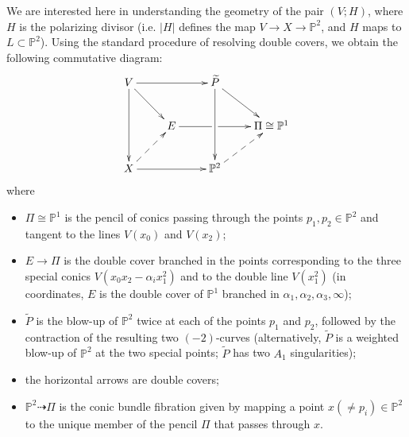 \documentclass{amsart}
\numberwithin{equation}{section}
\theoremstyle{plain}
\theoremstyle{remark}
\theoremstyle{definition}
\newcommand{\bP}{\mathbb{P}}
\begin{document}
We are interested here in understanding the geometry of the pair $(V;H)$, where $H$ is the polarizing divisor (i.e. $|H|$ defines the map $V\to X\to \bP^2$, and $H$ maps to $L\subset \bP^2$).  Using the standard procedure of resolving double covers,  we obtain the following commutative diagram:
$$\xymatrix{
V\ar@{->}[rr]\ar@{->}[dd]\ar@{->}[rd]&&\widetilde P\ar@{->}[dd]\ar@{->}[rd]&\\ 
&E\ar'[r][rr]&& \Pi\cong \bP^1\\
X\ar@{->}[rr]\ar@{-->}[ur]&&\bP^2\ar@{-->}[ur]&
}$$
where
\begin{itemize}
\item $\Pi\cong \bP^1$ is the pencil of conics passing through the points  $p_1,p_2\in \bP^2$ and tangent to the lines $V(x_0)$ and $V(x_2)$;
\item $E\to \Pi$ is the double cover branched in the points corresponding to the three special conics $V(x_0x_2-\alpha_ix_1^2)$ and to the double line $V(x_1^2)$ (in coordinates, $E$ is the double cover of $\bP^1$ branched in $\alpha_1,\alpha_2,\alpha_3,\infty$);
\item $\widetilde P$ is the blow-up of $\bP^2$ twice at each of the points  $p_1$ and $p_2$, followed by the contraction of the resulting two $(-2)$-curves (alternatively, $\widetilde P$ is a weighted blow-up of $\bP^2$ at the two special points; $\widetilde P$ has two $A_1$ singularities); 
\item the horizontal arrows are double covers;
\item $\bP^2\dashrightarrow \Pi$ is the conic bundle fibration given by mapping a  point $x(\neq p_i)\in \bP^2$ to the unique member of the pencil $\Pi$ that passes through $x$.
\end{itemize}
\end{document}
